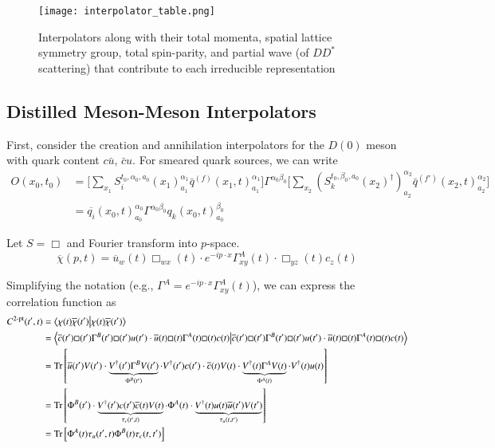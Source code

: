 \begin{figure}
    \centering
\texttt{[image: interpolator\_table.png]}\
\caption{Interpolators along with their total momenta, spatial lattice symmetry group, total spin-parity, and partial wave (of $DD^*$ scattering) that contribute to each irreducible representation}
\end{figure}
\subsection{Distilled Meson-Meson Interpolators}
First, consider the creation and annihilation interpolators for the \(D(0)\) meson with quark content \(c\bar{u}\), \(\bar{c}u\). For smeared quark sources, we can write \cite{peardon_novel_2009} 
\begin{align}
    O(x_0,t_0) &= \Bigg[\sum_{x_1} S_i^{t_0,\alpha_0,a_0}(x_1)^{\alpha_1}_{a_1}\bar{q}^{(f)}(x_1,t)^{\alpha_1}_{a_1}\Bigg] \Gamma^{\alpha_0\beta_0} \Bigg[\sum_{x_2} (S_k^{t_0,\beta_0,a_0}(x_2)^\dagger)^{\alpha_2}_{a_2}\bar{q}^{(f')}(x_2,t)^{\alpha_2}_{a_2}\Bigg] \\
    &= \overline{q_i}(x_0, t)^{\alpha_0}_{a_0} \Gamma^{\alpha_0\beta_0} q_k(x_0,t)^{\beta_0}_{a_0}
\end{align}

Let \(S = \Box\) and Fourier transform into \(p\)-space. 
\[
\overline{\chi}(p, t) = \overline{u}_w(t) \Box_{wx}(t) \cdot e^{-ip\cdot x} \Gamma^A_{xy}(t) \cdot \Box_{yz}(t) c_z(t)
\]

Simplifying the notation (e.g., \(\Gamma^A = e^{-ip\cdot x} \Gamma^A_{xy}(t)\)), we can express the correlation function as 
\begin{align}
C^{2\text{-pt}}(t^\prime, t) &= \braket{\chi(t) \overline{\chi}(t^\prime)} \\
&= \braket{
\overline{c}(t^\prime) \Box(t^\prime) \Gamma^B(t^\prime) \Box(t^\prime) u(t^\prime) \cdot
\overline{u}(t) \Box(t) \Gamma^A(t) \Box(t) c(t)
} \\ 
&= \text{Tr}\left[
    \overline{u}(t^\prime) V(t^\prime) \cdot 
    \underbrace{V^\dagger(t^\prime) \Gamma^B V(t^\prime)}_{\Phi^B(t^\prime)} \cdot 
    V^\dagger(t^\prime) c(t^\prime) \cdot 
    \overline{c}(t) V(t) \cdot 
    \underbrace{V^\dagger(t) \Gamma^A V(t)}_{\Phi^A(t)} \cdot 
    V^\dagger(t) u(t)
\right] \\
&= \text{Tr} \left[\Phi^B(t^\prime) \cdot 
    \underbrace{V^\dagger(t^\prime) c(t^\prime) \overline{c}(t) V(t)}_{\tau_c(t^\prime, t)} \cdot 
    \Phi^A(t) \cdot 
    \underbrace{V^\dagger(t) u(t) \overline{u}(t^\prime) V(t^\prime)}_{\tau_u(t, t^\prime)}
\right] \\
&= \text{Tr}\left[\Phi^A(t) \tau_u(t^\prime, t) \Phi^B(t) \tau_c(t, t^\prime)\right]
\end{align}

